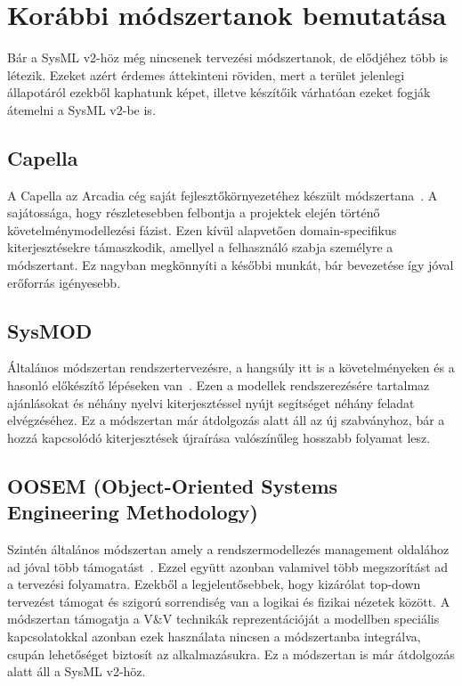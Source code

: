 \section{Korábbi módszertanok bemutatása} \label{sec:KorabbiModszerek}
Bár a SysML v2-höz még nincsenek tervezési módszertanok, de elődjéhez több is létezik.
Ezeket azért érdemes áttekinteni röviden, mert a terület jelenlegi állapotáról ezekből kaphatunk képet, illetve készítőik várhatóan ezeket fogják átemelni a SysML v2-be is.

    \subsection{Capella}
    A Capella az Arcadia cég saját fejlesztőkörnyezetéhez készült módszertana~\cite{Capella2024}. A sajátossága, hogy részletesebben felbontja a projektek elején történő követelménymodellezési fázist.
    Ezen kívül alapvetően domain-specifikus kiterjesztésekre támaszkodik, amellyel a felhasználó szabja személyre a módszertant. Ez nagyban megkönnyíti a későbbi munkát, bár bevezetése így jóval erőforrás igényesebb.

    \subsection{SysMOD}
    Általános módszertan rendszertervezésre, a hangsúly itt is a követelményeken és a hasonló előkészítő lépéseken van~\cite{Weilkiens2020}.
    Ezen a modellek rendszerezésére tartalmaz ajánlásokat és néhány nyelvi kiterjesztéssel nyújt segítséget néhány feladat elvégzéséhez.
    Ez a módszertan már átdolgozás alatt áll az új szabványhoz, bár a hozzá kapcsolódó kiterjesztések újraírása valószínűleg hosszabb folyamat lesz.

    \subsection{OOSEM (Object-Oriented Systems Engineering Methodology)}
    Szintén általános módszertan amely a rendszermodellezés management oldalához ad jóval több támogatást~\cite{autoEEsystemEngineer2024}.
    Ezzel együtt azonban valamivel több megszorítást ad a tervezési folyamatra. Ezekből a legjelentősebbek, hogy kizárólat top-down tervezést támogat és szigorú sorrendiség van a logikai és fizikai nézetek között.
    A módszertan támogatja a V\&V technikák reprezentációját a modellben  speciális kapcsolatokkal azonban ezek használata nincsen a módszertanba integrálva, csupán lehetőséget biztosít az alkalmazásukra.
    Ez a módszertan is már átdolgozás alatt áll a SysML v2-höz.

